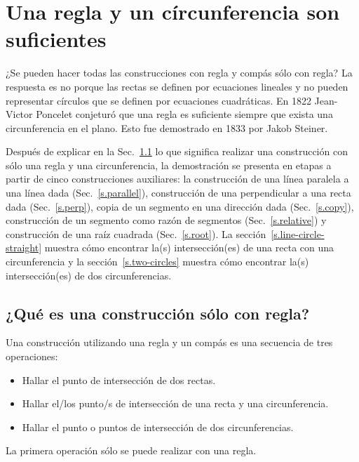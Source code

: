 
\chapter{Una regla y un círcunferencia son suficientes}\label{c.straightedge}


¿Se pueden hacer todas las construcciones con regla y compás sólo con regla? La respuesta es no porque las rectas se definen por ecuaciones lineales y no pueden representar círculos que se definen por ecuaciones cuadráticas. En 1822 Jean-Victor Poncelet conjeturó que una regla es suficiente siempre que exista una circunferencia en el plano. Esto fue demostrado en 1833 por Jakob Steiner.

Después de explicar en la Sec.~\ref{s.se-what} lo que significa realizar una construcción con sólo una regla y una circunferencia, la demostración se presenta en etapas a partir de cinco construcciones auxiliares: la construcción de una línea paralela a una línea dada (Sec.~\ref{s.parallel}), construcción de una perpendicular a una recta dada (Sec.~\ref{s.perp}), copia de un segmento en una dirección dada (Sec.~\ref{s.copy}), construcción de un segmento como razón de segmentos (Sec.~\ref{s.relative}) y construcción de una raíz cuadrada (Sec.~\ref{s.root}). La sección~\ref{s.line-circle-straight} muestra cómo encontrar la(s) intersección(es) de una recta con una circunferencia y la sección~\ref{s.two-circles} muestra cómo encontrar la(s) intersección(es) de dos circunferencias.

\section{¿Qué es una construcción sólo con regla?}\label{s.se-what}

Una construcción utilizando una regla y un compás es una secuencia de tres operaciones:
\begin{itemize}
\item Hallar el punto de intersección de dos rectas.
\item Hallar el/los punto/s de intersección de una recta y una circunferencia.
\item Hallar el punto o puntos de intersección de dos circunferencias.
\end{itemize}
La primera operación sólo se puede realizar con una regla.

